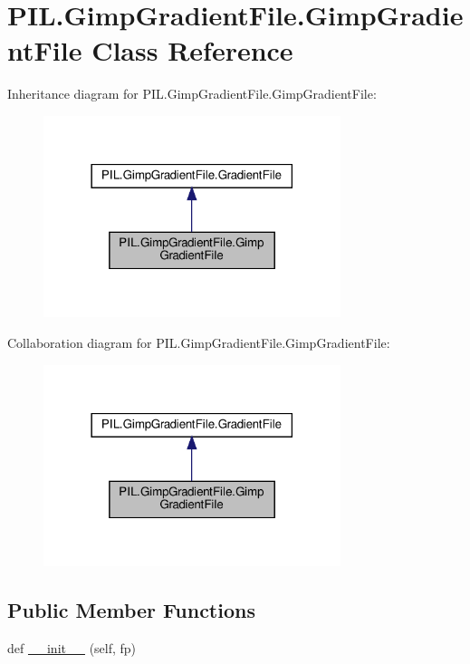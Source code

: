 \hypertarget{classPIL_1_1GimpGradientFile_1_1GimpGradientFile}{}\section{P\+I\+L.\+Gimp\+Gradient\+File.\+Gimp\+Gradient\+File Class Reference}
\label{classPIL_1_1GimpGradientFile_1_1GimpGradientFile}


Inheritance diagram for P\+I\+L.\+Gimp\+Gradient\+File.\+Gimp\+Gradient\+File\+:
\nopagebreak
\begin{figure}[H]
\begin{center}
\leavevmode
\includegraphics[width=246pt]{classPIL_1_1GimpGradientFile_1_1GimpGradientFile__inherit__graph}
\end{center}
\end{figure}


Collaboration diagram for P\+I\+L.\+Gimp\+Gradient\+File.\+Gimp\+Gradient\+File\+:
\nopagebreak
\begin{figure}[H]
\begin{center}
\leavevmode
\includegraphics[width=246pt]{classPIL_1_1GimpGradientFile_1_1GimpGradientFile__coll__graph}
\end{center}
\end{figure}
\subsection*{Public Member Functions}
\begin{DoxyCompactItemize}
\item 
def \hyperlink{classPIL_1_1GimpGradientFile_1_1GimpGradientFile_a836263a4adfe400345abc24d07d70d78}{\+\_\+\+\_\+init\+\_\+\+\_\+} (self, fp)
\end{DoxyCompactItemize}
